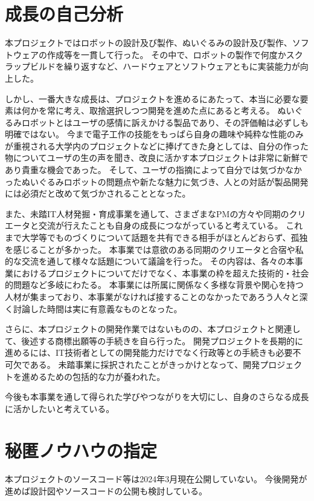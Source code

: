\documentclass[uplatex,a4paper,12pt]{jsarticle}
\begin{document}
\section{成長の自己分析}
本プロジェクトではロボットの設計及び製作、ぬいぐるみの設計及び製作、ソフトウェアの作成等を一貫して行った。
その中で、ロボットの製作で何度かスクラップビルドを繰り返すなど、ハードウェアとソフトウェアともに実装能力が向上した。

しかし、一番大きな成長は、プロジェクトを進めるにあたって、本当に必要な要素は何かを常に考え、取捨選択しつつ開発を進めた点にあると考える。
ぬいぐるみロボットとはユーザの感情に訴えかける製品であり、その評価軸は必ずしも明確ではない。
今まで電子工作の技能をもっぱら自身の趣味や純粋な性能のみが重視される大学内のプロジェクトなどに捧げてきた身としては、自分の作った物についてユーザの生の声を聞き、改良に活かす本プロジェクトは非常に新鮮であり貴重な機会であった。
そして、ユーザの指摘によって自分では気づかなかったぬいぐるみロボットの問題点や新たな魅力に気づき、人との対話が製品開発には必須だと改めて気づかされることとなった。

また、未踏IT人材発掘・育成事業を通して、さまざまなPMの方々や同期のクリエータと交流が行えたことも自身の成長につながっていると考えている。
これまで大学等でものづくりについて話題を共有できる相手がほとんどおらず、孤独を感じることが多かった。
本事業では意欲のある同期のクリエータと合宿や私的な交流を通して様々な話題について議論を行った。
その内容は、各々の本事業におけるプロジェクトについてだけでなく、本事業の枠を超えた技術的・社会的問題など多岐にわたる。
本事業には所属に関係なく多様な背景や関心を持つ人材が集まっており、本事業がなければ接することのなかったであろう人々と深く討論した時間は実に有意義なものとなった。

さらに、本プロジェクトの開発作業ではないものの、本プロジェクトと関連して、後述する商標出願等の手続きを自ら行った。
開発プロジェクトを長期的に進めるには、IT技術者としての開発能力だけでなく行政等との手続きも必要不可欠である。
未踏事業に採択されたことがきっかけとなって、開発プロジェクトを進めるための包括的な力が養われた。

今後も本事業を通して得られた学びやつながりを大切にし、自身のさらなる成長に活かしたいと考えている。


\section{秘匿ノウハウの指定}
本プロジェクトのソースコード等は2024年3月現在公開していない。
今後開発が進めば設計図やソースコードの公開も検討している。
\end{document}
